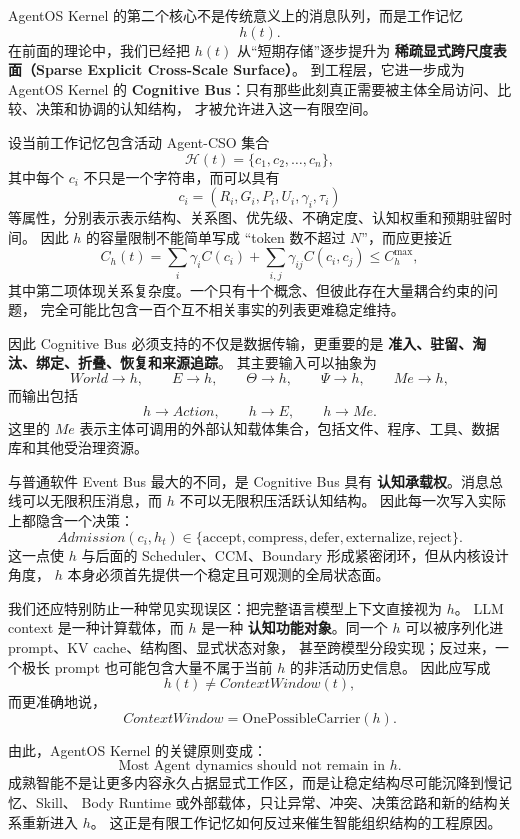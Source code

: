 AgentOS Kernel 的第二个核心不是传统意义上的消息队列，而是工作记忆
\[
h(t).
\]
在前面的理论中，我们已经把 $h(t)$ 从``短期存储''逐步提升为
\textbf{稀疏显式跨尺度表面（Sparse Explicit Cross-Scale Surface）}。
到工程层，它进一步成为 AgentOS Kernel 的
\textbf{Cognitive Bus}：只有那些此刻真正需要被主体全局访问、比较、决策和协调的认知结构，
才被允许进入这一有限空间。

设当前工作记忆包含活动 Agent-CSO 集合
\[
\mathcal H(t)
=
\{c_1,c_2,\ldots,c_n\},
\]
其中每个 $c_i$ 不只是一个字符串，而可以具有
\[
c_i=
(R_i,G_i,P_i,U_i,\gamma_i,\tau_i)
\]
等属性，分别表示表示结构、关系图、优先级、不确定度、认知权重和预期驻留时间。
因此 $h$ 的容量限制不能简单写成 ``token 数不超过 $N$''，而应更接近
\[
C_h(t)
=
\sum_i \gamma_i C(c_i)
+
\sum_{i,j}\gamma_{ij}C(c_i,c_j)
\leq C_h^{\max},
\]
其中第二项体现关系复杂度。一个只有十个概念、但彼此存在大量耦合约束的问题，
完全可能比包含一百个互不相关事实的列表更难稳定维持。

因此 Cognitive Bus 必须支持的不仅是数据传输，更重要的是
\textbf{准入、驻留、淘汰、绑定、折叠、恢复和来源追踪}。
其主要输入可以抽象为
\[
World\rightarrow h,\qquad
E\rightarrow h,\qquad
\Theta\rightarrow h,\qquad
\Psi\rightarrow h,\qquad
Me\rightarrow h,
\]
而输出包括
\[
h\rightarrow Action,\qquad
h\rightarrow E,\qquad
h\rightarrow Me.
\]
这里的 $Me$ 表示主体可调用的外部认知载体集合，包括文件、程序、工具、数据库和其他受治理资源。

与普通软件 Event Bus 最大的不同，是 Cognitive Bus 具有
\textbf{认知承载权}。消息总线可以无限积压消息，而 $h$ 不可以无限积压活跃认知结构。
因此每一次写入实际上都隐含一个决策：
\[
Admission(c_i,h_t)\in
\{\mathrm{accept},\mathrm{compress},\mathrm{defer},
\mathrm{externalize},\mathrm{reject}\}.
\]
这一点使 $h$ 与后面的 Scheduler、CCM、Boundary 形成紧密闭环，但从内核设计角度，
$h$ 本身必须首先提供一个稳定且可观测的全局状态面。

我们还应特别防止一种常见实现误区：把完整语言模型上下文直接视为 $h$。
LLM context 是一种计算载体，而 $h$ 是一种
\textbf{认知功能对象}。同一个 $h$ 可以被序列化进 prompt、KV cache、结构图、显式状态对象，
甚至跨模型分段实现；反过来，一个极长 prompt 也可能包含大量不属于当前 $h$ 的非活动历史信息。
因此应写成
\[
\boxed{
h(t)\neq ContextWindow(t),
}
\]
而更准确地说，
\[
ContextWindow
=
\mathrm{OnePossibleCarrier}(h).
\]

由此，AgentOS Kernel 的关键原则变成：
\[
\boxed{
\text{Most Agent dynamics should not remain in }h.
}
\]
成熟智能不是让更多内容永久占据显式工作区，而是让稳定结构尽可能沉降到慢记忆、Skill、
Body Runtime 或外部载体，只让异常、冲突、决策岔路和新的结构关系重新进入 $h$。
这正是有限工作记忆如何反过来催生智能组织结构的工程原因。



